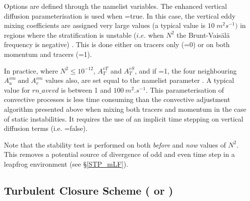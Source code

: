 
Options are defined through the   namelist variables.
The enhanced vertical diffusion parameterisation is used when =true. 
In this case, the vertical eddy mixing coefficients are assigned very large values 
(a typical value is $10\;m^2s^{-1})$ in regions where the stratification is unstable 
($i.e.$ when $N^2$ the Brunt-Vais\"{a}l\"{a} frequency is negative) 
\citep{Lazar_PhD97, Lazar_al_JPO99}. This is done either on tracers only 
(=0) or on both momentum and tracers (=1).

In practice, where $N^2\leq 10^{-12}$, $A_T^{vT}$ and $A_T^{vS}$, and 
if =1, the four neighbouring $A_u^{vm} \;\mbox{and}\;A_v^{vm}$ 
values also, are set equal to the namelist parameter . A typical value 
for $rn\_avevd$ is between 1 and $100~m^2.s^{-1}$. This parameterisation of 
convective processes is less time consuming than the convective adjustment 
algorithm presented above when mixing both tracers and momentum in the 
case of static instabilities. It requires the use of an implicit time stepping on 
vertical diffusion terms (i.e. =false). 

Note that the stability test is performed on both \textit{before} and \textit{now} 
values of $N^2$. This removes a potential source of divergence of odd and
even time step in a leapfrog environment \citep{Leclair_PhD2010} (see \S\ref{STP_mLF}).

\subsection{Turbulent Closure Scheme ( or )}
\label{ZDF_tcs}

